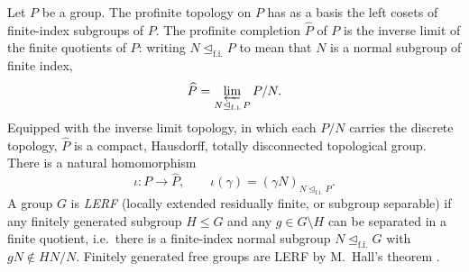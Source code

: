\documentclass[11pt]{amsart}
\theoremstyle{plain}
\theoremstyle{definition}
\newcommand{\fii}{\trianglelefteq_{\mathrm{f.i.}}}
\begin{document}
Let $P$ be a group. The profinite topology on $P$ has as a basis the left
cosets of finite-index subgroups of $P$. The profinite completion $\widehat P$
of $P$ is the inverse limit of the finite quotients of $P$: writing
$N\fii P$ to mean that $N$ is a normal subgroup of finite index,
\[
  \widehat P=\varprojlim_{N\fii P} P/N .
\]
Equipped with the inverse limit topology, in which each $P/N$ carries the
discrete topology, $\widehat P$ is a compact, Hausdorff, totally disconnected
topological group. There is a natural homomorphism
\[
  \iota\colon P\longrightarrow\widehat P,\qquad \iota(\gamma)=(\gamma N)_{N\fii P}.
\]
A group $G$ is \emph{LERF} (locally extended residually finite, or subgroup
separable) if any finitely generated subgroup $H\le G$ and any
$g\in G\setminus H$ can be separated in a finite quotient, i.e.\ there is a
finite-index normal subgroup $N\fii G$ with $gN\notin HN/N$. Finitely generated
free groups are LERF by M.~Hall's theorem \cite{Hall}.
\end{document}
